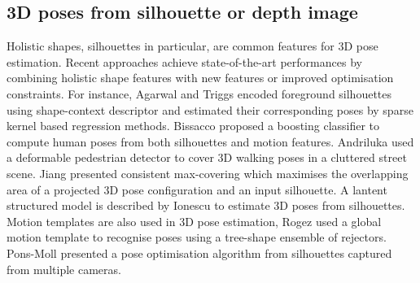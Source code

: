 \subsection{3D poses from silhouette or depth image} 
Holistic shapes, silhouettes in particular, are common features for 3D pose estimation. 
Recent approaches achieve state-of-the-art performances by combining holistic shape features with new features or improved optimisation constraints. 
For instance, Agarwal and Triggs encoded foreground silhouettes using shape-context descriptor and estimated their corresponding poses by sparse kernel based regression methods.   
Bissacco \etal \cite{Bissacco2007} proposed a boosting classifier to compute human poses from both silhouettes and motion features.  
Andriluka \etal used a deformable pedestrian detector to cover 3D walking poses in a cluttered street scene.  
Jiang \etal \cite{Jiang2011} presented consistent max-covering which maximises the overlapping area of a projected 3D pose configuration and an input silhouette. 
A lantent structured model is described by Ionescu \etal \cite{Ionescu2011} to estimate 3D poses from silhouettes. 
Motion templates are also used in 3D pose estimation, Rogez \etal \cite{Rogez2012} used a global motion template to recognise poses using a tree-shape ensemble of rejectors. 
Pons-Moll \etal \cite{Pons-Moll2011} presented a pose optimisation algorithm from silhouettes captured from multiple cameras. 

